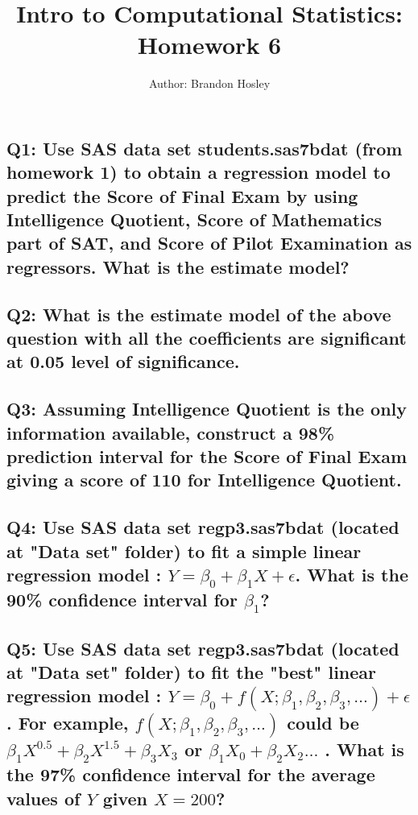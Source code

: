 \documentclass[a4paper,man,natbib]{apa6}
\title{Intro to Computational Statistics: Homework 6}
\author{Author: Brandon Hosley}
\affiliation{Instructor: Liang Kong, Ph.D}
\begin{document}
\maketitle
\singlespacing
	
\subsection*{Q1: Use SAS data set students.sas7bdat (from homework 1) to obtain a regression model to predict the Score of Final Exam by using Intelligence Quotient, Score of Mathematics part of SAT, and Score of Pilot Examination as regressors. What is the estimate model? }
% 

\subsection*{Q2: What is the estimate model of the above question with all the coefficients are significant at 0.05 level of significance. }
% 

\subsection*{Q3: Assuming Intelligence Quotient is the only information available, construct a 98\% prediction interval for the Score of Final Exam giving a score of 110 for Intelligence Quotient. }
% 

\subsection*{Q4: Use SAS data set regp3.sas7bdat (located at "Data set" folder) to fit a simple linear regression model : $Y = \beta_0 + \beta_1X + \epsilon$. What is the 90\% confidence interval for $\beta_1$?
 }
% 


\subsection*{Q5: Use SAS data set regp3.sas7bdat (located at "Data set" folder) to fit the "best" linear regression model : $Y = \beta_0 + f(X; \beta_1, \beta_2, \beta_3, \ldots) + \epsilon$. For example, $f(X; \beta_1, \beta_2, \beta_3, \ldots)$ could be $\beta_1X^{0.5} + \beta_2 X^{1.5} + \beta_3 X_3$ or $\beta_1X_0 + \beta_2 X_2 \ldots$ . What is the 97\% confidence interval for the average values of $Y$ given $X=200$? }
% 


%
%
\end{document}
